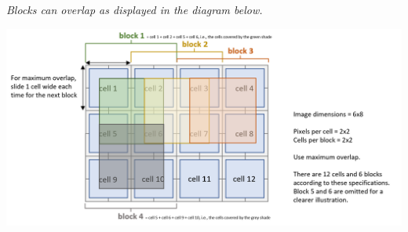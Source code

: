 \emph{Blocks can overlap as displayed in the diagram below.}

    \includegraphics[width=1.3\textwidth]{images/hog-diagram.png}

